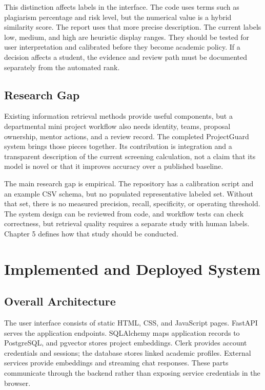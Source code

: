 \documentclass[12pt,a4paper]{report}
\begin{document}
This distinction affects labels in the interface. The code uses terms such as plagiarism percentage and risk level, but the numerical value is a hybrid similarity score. The report uses that more precise description. The current labels low, medium, and high are heuristic display ranges. They should be tested for user interpretation and calibrated before they become academic policy. If a decision affects a student, the evidence and review path must be documented separately from the automated rank.

\section{Research Gap}
Existing information retrieval methods provide useful components, but a departmental mini project workflow also needs identity, teams, proposal ownership, mentor actions, and a review record. The completed ProjectGuard system brings those pieces together. Its contribution is integration and a transparent description of the current screening calculation, not a claim that its model is novel or that it improves accuracy over a published baseline.

The main research gap is empirical. The repository has a calibration script and an example CSV schema, but no populated representative labeled set. Without that set, there is no measured precision, recall, specificity, or operating threshold. The system design can be reviewed from code, and workflow tests can check correctness, but retrieval quality requires a separate study with human labels. Chapter 5 defines how that study should be conducted.

\chapter{Implemented and Deployed System}
\section{Overall Architecture}
The user interface consists of static HTML, CSS, and JavaScript pages. FastAPI serves the application endpoints. SQLAlchemy maps application records to PostgreSQL, and pgvector stores project embeddings. Clerk provides account credentials and sessions; the database stores linked academic profiles. External services provide embeddings and streaming chat responses. These parts communicate through the backend rather than exposing service credentials in the browser.
\end{document}
